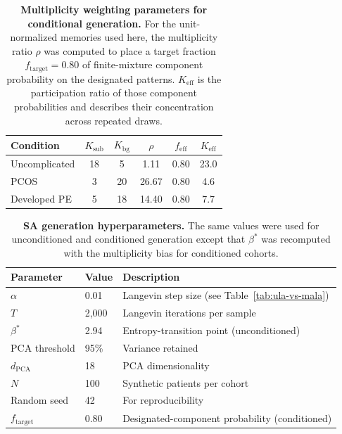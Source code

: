 \begin{table}[ht]
\centering
\caption{\textbf{Multiplicity weighting parameters for conditional generation.}
For the unit-normalized memories used here, the multiplicity ratio $\rho$ was computed
to place a target fraction $f_{\text{target}} = 0.80$ of finite-mixture component
probability on the designated patterns. $K_{\text{eff}}$ is the participation ratio of
those component probabilities and describes their concentration across repeated draws.}
\label{stab:multiplicity}
\begin{tabular}{lccccc}
\toprule
Condition & $K_{\text{sub}}$ & $K_{\text{bg}}$ & $\rho$ & $f_{\text{eff}}$ & $K_{\text{eff}}$ \\
\midrule
Uncomplicated  & 18 & 5  & 1.11  & 0.80 & 23.0 \\
PCOS           & 3  & 20 & 26.67 & 0.80 & 4.6 \\
Developed PE   & 5  & 18 & 14.40 & 0.80 & 7.7 \\
\bottomrule
\end{tabular}
\end{table}

\begin{table}[ht]
\centering
\caption{\textbf{SA generation hyperparameters.} The same values were used for
unconditioned and conditioned generation except that $\beta^*$ was recomputed with the
multiplicity bias for conditioned cohorts.}
\label{stab:hyperparams}
\begin{tabular}{lll}
\toprule
Parameter & Value & Description \\
\midrule
$\alpha$ & 0.01 & Langevin step size (see Table~\ref{tab:ula-vs-mala}) \\
$T$ & 2,000 & Langevin iterations per sample \\
$\beta^*$ & 2.94 & Entropy-transition point (unconditioned) \\
PCA threshold & 95\% & Variance retained \\
$d_{\text{PCA}}$ & 18 & PCA dimensionality \\
$N$ & 100 & Synthetic patients per cohort \\
Random seed & 42 & For reproducibility \\
$f_{\text{target}}$ & 0.80 & Designated-component probability (conditioned) \\
\bottomrule
\end{tabular}
\end{table}

